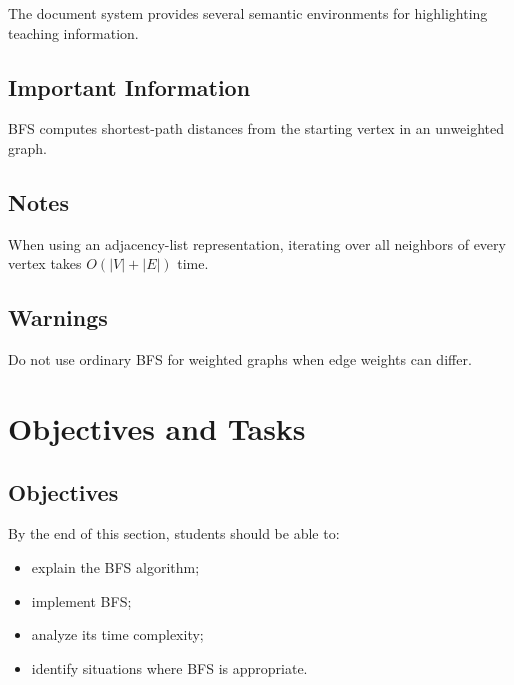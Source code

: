 \documentclass{csdept}
\begin{document}
The document system provides several semantic environments for
highlighting teaching information.

\subsection{Important Information}

\begin{important}

BFS computes shortest-path distances from the starting vertex
in an unweighted graph.

\end{important}

\subsection{Notes}

\begin{note}

When using an adjacency-list representation, iterating over all
neighbors of every vertex takes $O(|V|+|E|)$ time.

\end{note}

\subsection{Warnings}

\begin{warning}

Do not use ordinary BFS for weighted graphs when edge weights
can differ.

\end{warning}

\section{Objectives and Tasks}

\subsection{Objectives}

\begin{objective}

By the end of this section, students should be able to:

\begin{itemize}
    \item explain the BFS algorithm;
    \item implement BFS;
    \item analyze its time complexity;
    \item identify situations where BFS is appropriate.
\end{itemize}

\end{objective}
\end{document}
